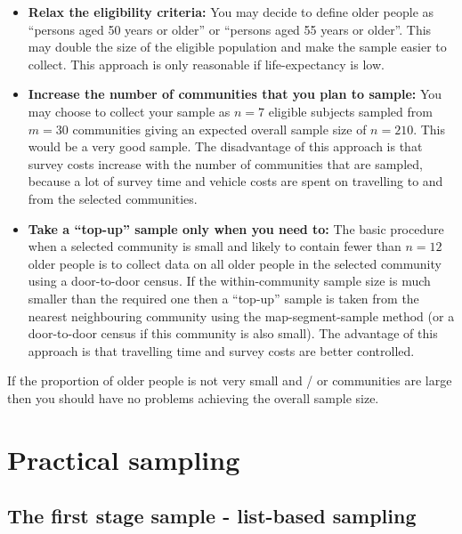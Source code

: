 \documentclass[12pt,]{book}
\theoremstyle{definition}
\theoremstyle{definition}
\theoremstyle{definition}
\theoremstyle{remark}
\begin{document}
\begin{itemize}
\item
  \textbf{Relax the eligibility criteria:} You may decide to define
  older people as ``persons aged 50 years or older'' or ``persons aged
  55 years or older''. This may double the size of the eligible
  population and make the sample easier to collect. This approach is
  only reasonable if life-expectancy is low.
\item
  \textbf{Increase the number of communities that you plan to sample:}
  You may choose to collect your sample as \(n = 7\) eligible subjects
  sampled from \(m = 30\) communities giving an expected overall sample
  size of \(n = 210\). This would be a very good sample. The
  disadvantage of this approach is that survey costs increase with the
  number of communities that are sampled, because a lot of survey time
  and vehicle costs are spent on travelling to and from the selected
  communities.
\item
  \textbf{Take a ``top-up'' sample only when you need to:} The basic
  procedure when a selected community is small and likely to contain
  fewer than \(n = 12\) older people is to collect data on all older
  people in the selected community using a door-to-door census. If the
  within-community sample size is much smaller than the required one
  then a ``top-up'' sample is taken from the nearest neighbouring
  community using the map-segment-sample method (or a door-to-door
  census if this community is also small). The advantage of this
  approach is that travelling time and survey costs are better
  controlled.
\end{itemize}

If the proportion of older people is not very small and / or communities
are large then you should have no problems achieving the overall sample
size.

\newpage

\hypertarget{practical-sampling}{%
\section{Practical sampling}\label{practical-sampling}}

\hypertarget{the-first-stage-sample---list-based-sampling}{%
\subsection{The first stage sample - list-based
sampling}\label{the-first-stage-sample---list-based-sampling}}
\end{document}
